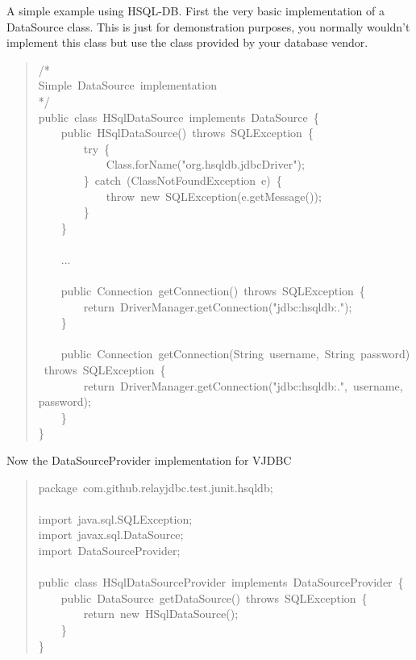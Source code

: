 \documentclass[10pt,a4paper,english]{article}
\begin{document}
A simple example using HSQL-DB. First the very basic implementation of a DataSource class. This is just for demonstration purposes, you normally wouldn't implement this class but use the class provided by your database vendor.
\begin{quote}{\ttfamily \raggedright \noindent
/*~\\
Simple~DataSource~implementation~\\
*/~\\
public~class~HSqlDataSource~implements~DataSource~{\{}~\\
~~~~public~HSqlDataSource()~throws~SQLException~{\{}~\\
~~~~~~~~try~{\{}~\\
~~~~~~~~~~~~Class.forName("org.hsqldb.jdbcDriver");~\\
~~~~~~~~{\}}~catch~(ClassNotFoundException~e)~{\{}~\\
~~~~~~~~~~~~throw~new~SQLException(e.getMessage());~\\
~~~~~~~~{\}}~\\
~~~~{\}}~\\
~\\
~~~~...~\\
~\\
~~~~public~Connection~getConnection()~throws~SQLException~{\{}~\\
~~~~~~~~return~DriverManager.getConnection("jdbc:hsqldb:.");~\\
~~~~{\}}~\\
~\\
~~~~public~Connection~getConnection(String~username,~String~password)~throws~SQLException~{\{}~\\
~~~~~~~~return~DriverManager.getConnection("jdbc:hsqldb:.",~username,~password);~\\
~~~~{\}}~\\
{\}}
}\end{quote}

Now the DataSourceProvider implementation for VJDBC
\begin{quote}{\ttfamily \raggedright \noindent
package~com.github.relayjdbc.test.junit.hsqldb;~\\
~\\
import~java.sql.SQLException;~\\
import~javax.sql.DataSource;~\\
import~DataSourceProvider;~\\
~\\
public~class~HSqlDataSourceProvider~implements~DataSourceProvider~{\{}~\\
~~~~public~DataSource~getDataSource()~throws~SQLException~{\{}~\\
~~~~~~~~return~new~HSqlDataSource();~\\
~~~~{\}}~\\
{\}}
}\end{quote}
\end{document}
